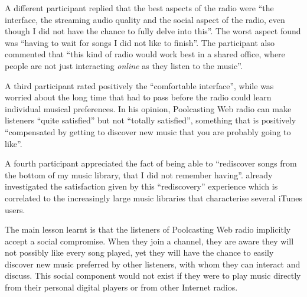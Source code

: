 A different participant replied that the best aspects of the radio were ``the interface, the streaming audio quality and the social aspect of the radio, even though I did not have the chance to fully delve into this''. The worst aspect found was ``having to wait for songs I did not like to finish''. The participant also commented that ``this kind of radio would work best in a shared office, where people are not just interacting \emph{online} as they listen to the music''.

A third participant rated positively the ``comfortable interface'', while was worried about the long time that had to pass before the radio could learn individual musical preferences. 
In his opinion, Poolcasting Web radio can make listeners ``quite satisfied'' but not ``totally satisfied'', something that is positively ``compensated by getting to discover new music that you are probably going to like''.



A fourth participant appreciated the fact of being able to ``rediscover songs from the bottom of my music library, that I did not remember having''.
\citet{Voida06} already investigated the satisfaction given by this ``rediscovery'' experience which is correlated to the increasingly large music libraries that characterise several iTunes users.

The main lesson learnt is that the listeners of Poolcasting Web radio implicitly accept a social compromise. When they join a channel, they are aware they will not possibly like every song played, yet they will have the chance to easily discover new music preferred by other listeners, with whom they can interact and discuss.
This social component would not exist if they were to play music directly from their personal digital players or from other Internet radios.

